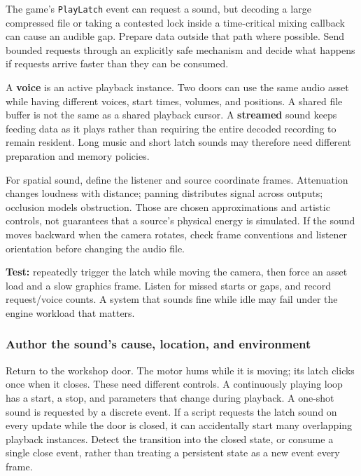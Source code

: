 The game's \texttt{PlayLatch} event can request a sound, but decoding a large compressed file or taking a contested lock inside a time-critical mixing callback can cause an audible gap. Prepare data outside that path where possible. Send bounded requests through an explicitly safe mechanism and decide what happens if requests arrive faster than they can be consumed.

A \textbf{voice} is an active playback instance. Two doors can use the same audio asset while having different voices, start times, volumes, and positions. A shared file buffer is not the same as a shared playback cursor. A \textbf{streamed} sound keeps feeding data as it plays rather than requiring the entire decoded recording to remain resident. Long music and short latch sounds may therefore need different preparation and memory policies.

For spatial sound, define the listener and source coordinate frames. Attenuation changes loudness with distance; panning distributes signal across outputs; occlusion models obstruction. Those are chosen approximations and artistic controls, not guarantees that a source's physical energy is simulated. If the sound moves backward when the camera rotates, check frame conventions and listener orientation before changing the audio file.

\textbf{Test:} repeatedly trigger the latch while moving the camera, then force an asset load and a slow graphics frame. Listen for missed starts or gaps, and record request/voice counts. A system that sounds fine while idle may fail under the engine workload that matters.

\subsubsection{Author the sound's cause, location, and environment}\label{06-engine-ii-ch040-author-the-sounds-cause-location-and-environment}

Return to the workshop door. The motor hums while it is moving; its latch clicks once when it closes. These need different controls. A continuously playing loop has a start, a stop, and parameters that change during playback. A one-shot sound is requested by a discrete event. If a script requests the latch sound on every update while the door is closed, it can accidentally start many overlapping playback instances. Detect the transition into the closed state, or consume a single close event, rather than treating a persistent state as a new event every frame.

